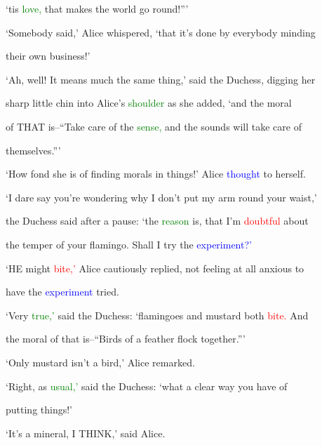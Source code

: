 ‘tis \textcolor{green}{love,} that makes the world go round!”’



 ‘Somebody said,’ Alice whispered, ‘that it’s done by everybody minding

 their own business!’



 ‘Ah, well! It means much the same thing,’ said the Duchess, digging her

 sharp little chin into Alice’s \textcolor{green}{shoulder} as she added, ‘and the \textcolor{BurntOrange}{moral}

 of THAT is--“Take care of the \textcolor{green}{sense,} and the sounds will take care of

 themselves.”’



 ‘How fond she is of finding \textcolor{BurntOrange}{morals} in things!’ Alice \textcolor{blue}{thought} to herself.



 ‘I \textcolor{BurntOrange}{dare} say you’re wondering why I don’t put my arm round your waist,’

 the Duchess said after a pause: ‘the \textcolor{green}{reason} is, that I’m \textcolor{red}{doubtful} about

 the temper of your flamingo. Shall I try the \textcolor{blue}{experiment?’}



 ‘HE might \textcolor{red}{bite,’} Alice \textcolor{BurntOrange}{cautiously} replied, not feeling at all \textcolor{BurntOrange}{anxious} to

 have the \textcolor{blue}{experiment} tried.



 ‘Very \textcolor{green}{true,’} said the Duchess: ‘flamingoes and mustard both \textcolor{red}{bite.} And

 the \textcolor{BurntOrange}{moral} of that is--“Birds of a feather flock together.”’



 ‘Only mustard isn’t a bird,’ Alice remarked.



 ‘Right, as \textcolor{green}{usual,’} said the Duchess: ‘what a clear way you have of

 putting things!’



 ‘It’s a mineral, I THINK,’ said Alice.



